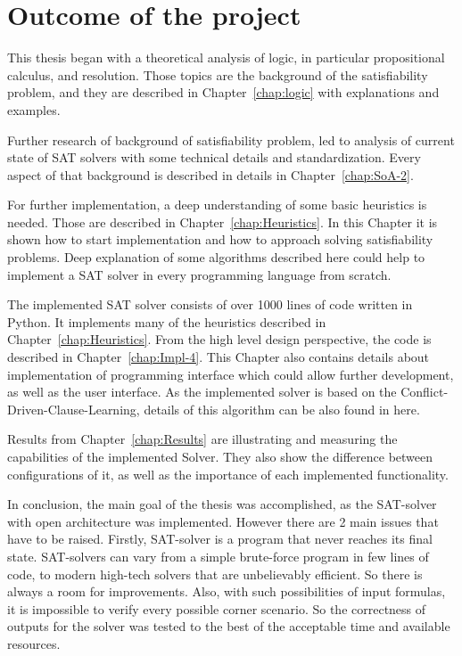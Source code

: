 \documentclass[12pt,english,pdflatex]{aghdpl}
\begin{document}
\section{Outcome of the project}
This thesis began with a theoretical analysis of logic, in particular propositional calculus, and resolution. Those topics are the background of the satisfiability problem, and they are described in Chapter~\ref{chap:logic} with explanations and examples.

Further research of background of satisfiability problem, led to analysis of current state of SAT solvers with some technical details and standardization. Every aspect of that background is described in details in Chapter~\ref{chap:SoA-2}.

For further implementation, a deep understanding of some basic heuristics is needed. Those are described in Chapter~\ref{chap:Heuristics}. In this Chapter it is shown how to start implementation and how to approach solving satisfiability problems. Deep explanation of some algorithms described here could help to implement a SAT solver in every programming language from  scratch.

The implemented SAT solver consists of over 1000 lines of code written in Python. It implements many of the heuristics described in Chapter~\ref{chap:Heuristics}. From the high level design perspective, the code is described in Chapter~\ref{chap:Impl-4}. This Chapter also contains details about implementation of programming interface which could allow further development, as well as the user interface. As the implemented solver is based on the Conflict-Driven-Clause-Learning, details of this algorithm can be also found in here.

Results from Chapter~\ref{chap:Results} are illustrating and measuring the capabilities of the implemented Solver. They also show the difference between configurations of it, as well as the importance of each implemented functionality. 

In conclusion, the main goal of the thesis was accomplished, as the SAT-solver with open architecture was implemented. However there are 2 main issues that have to be raised. Firstly, SAT-solver is a program that never reaches its final state. SAT-solvers can vary from a simple brute-force program in few lines of code, to modern high-tech solvers that are unbelievably efficient. So there is always a room for improvements. Also, with such possibilities of input formulas, it is impossible to verify every possible corner scenario. So the correctness of outputs for the solver was tested to the best of the acceptable time and available resources. 
\end{document}
